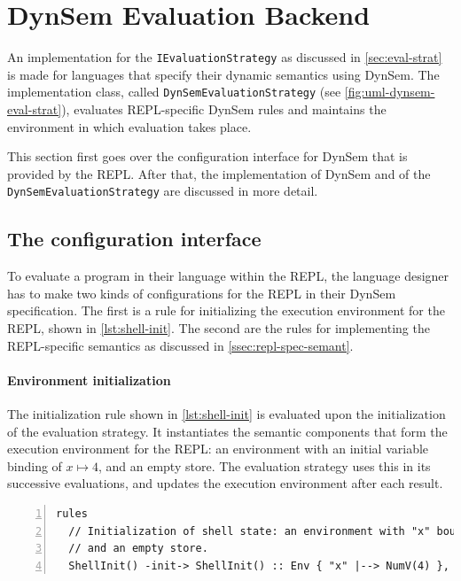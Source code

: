 \section{DynSem Evaluation Backend}
\label{sec:dynsem-eval-strat}
An implementation for the \texttt{IEvaluationStrategy} as discussed in
\cref{sec:eval-strat} is made for languages that specify their dynamic
semantics using DynSem. The implementation class, called
\texttt{DynSemEvaluationStrategy} (see \cref{fig:uml-dynsem-eval-strat}),
evaluates REPL-specific DynSem rules and maintains the environment in which
evaluation takes place.

This section first goes over the configuration interface for DynSem that is
provided by the REPL. After that, the implementation of DynSem and of the
\texttt{DynSemEvaluationStrategy} are discussed in more detail.

\subsection{The configuration interface}
\label{sec:impl-repl-spec}
To evaluate a program in their language within the REPL, the language designer
has to make two kinds of configurations for the REPL in their DynSem
specification. The first is a rule for initializing the execution environment
for the REPL, shown in \cref{lst:shell-init}. The second are the rules for
implementing the REPL-specific semantics as discussed in
\cref{ssec:repl-spec-semant}.

\paragraph{Environment initialization} The initialization rule shown in
\cref{lst:shell-init} is evaluated upon the initialization of the evaluation
strategy. It instantiates the semantic components that form the execution
environment for the REPL: an environment with an initial variable binding of
$x \mapsto 4$, and an empty store. The evaluation strategy uses this in its
successive evaluations, and updates the execution environment after each result.

\begin{minipage}{\textwidth}
\begin{lstlisting}[language=dynsem,caption={The initialization rule for the
semantic components.},label={lst:shell-init},numbers=left]
rules
  // Initialization of shell state: an environment with "x" bound to 4,
  // and an empty store.
  ShellInit() -init-> ShellInit() :: Env { "x" |--> NumV(4) }, Store {}.
\end{lstlisting}
\end{minipage}

